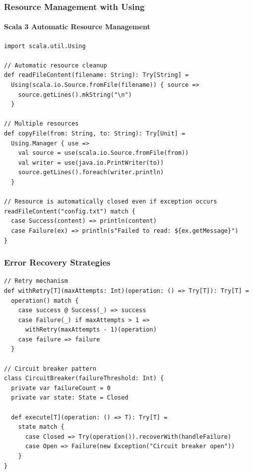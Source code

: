 \documentclass{beamer}
\begin{document}
\begin{frame}[fragile]
\frametitle{Resource Management with Using}
\framesubtitle{Scala 3 Automatic Resource Management}

\begin{lstlisting}[style=scalaStyle]
import scala.util.Using

// Automatic resource cleanup
def readFileContent(filename: String): Try[String] = 
  Using(scala.io.Source.fromFile(filename)) { source =>
    source.getLines().mkString("\n")
  }

// Multiple resources
def copyFile(from: String, to: String): Try[Unit] = 
  Using.Manager { use =>
    val source = use(scala.io.Source.fromFile(from))
    val writer = use(java.io.PrintWriter(to))
    source.getLines().foreach(writer.println)
  }

// Resource is automatically closed even if exception occurs
readFileContent("config.txt") match {
  case Success(content) => println(content)
  case Failure(ex) => println(s"Failed to read: ${ex.getMessage}")
}
\end{lstlisting}

\end{frame}

\begin{frame}[fragile]
\frametitle{Error Recovery Strategies}

\begin{lstlisting}[style=scalaStyle]
// Retry mechanism
def withRetry[T](maxAttempts: Int)(operation: () => Try[T]): Try[T] = 
  operation() match {
    case success @ Success(_) => success
    case Failure(_) if maxAttempts > 1 => 
      withRetry(maxAttempts - 1)(operation)
    case failure => failure
  }

// Circuit breaker pattern
class CircuitBreaker(failureThreshold: Int) {
  private var failureCount = 0
  private var state: State = Closed
  
  def execute[T](operation: () => T): Try[T] = 
    state match {
      case Closed => Try(operation()).recoverWith(handleFailure)
      case Open => Failure(new Exception("Circuit breaker open"))
    }
}
\end{lstlisting}

\end{frame}
\end{document}
